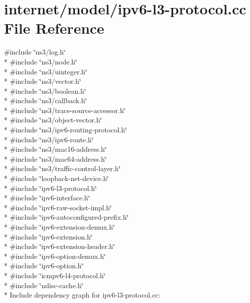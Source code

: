 \hypertarget{ipv6-l3-protocol_8cc}{}\section{internet/model/ipv6-\/l3-\/protocol.cc File Reference}
\label{ipv6-l3-protocol_8cc}
{\ttfamily \#include \char`\"{}ns3/log.\+h\char`\"{}}\\*
{\ttfamily \#include \char`\"{}ns3/node.\+h\char`\"{}}\\*
{\ttfamily \#include \char`\"{}ns3/uinteger.\+h\char`\"{}}\\*
{\ttfamily \#include \char`\"{}ns3/vector.\+h\char`\"{}}\\*
{\ttfamily \#include \char`\"{}ns3/boolean.\+h\char`\"{}}\\*
{\ttfamily \#include \char`\"{}ns3/callback.\+h\char`\"{}}\\*
{\ttfamily \#include \char`\"{}ns3/trace-\/source-\/accessor.\+h\char`\"{}}\\*
{\ttfamily \#include \char`\"{}ns3/object-\/vector.\+h\char`\"{}}\\*
{\ttfamily \#include \char`\"{}ns3/ipv6-\/routing-\/protocol.\+h\char`\"{}}\\*
{\ttfamily \#include \char`\"{}ns3/ipv6-\/route.\+h\char`\"{}}\\*
{\ttfamily \#include \char`\"{}ns3/mac16-\/address.\+h\char`\"{}}\\*
{\ttfamily \#include \char`\"{}ns3/mac64-\/address.\+h\char`\"{}}\\*
{\ttfamily \#include \char`\"{}ns3/traffic-\/control-\/layer.\+h\char`\"{}}\\*
{\ttfamily \#include \char`\"{}loopback-\/net-\/device.\+h\char`\"{}}\\*
{\ttfamily \#include \char`\"{}ipv6-\/l3-\/protocol.\+h\char`\"{}}\\*
{\ttfamily \#include \char`\"{}ipv6-\/interface.\+h\char`\"{}}\\*
{\ttfamily \#include \char`\"{}ipv6-\/raw-\/socket-\/impl.\+h\char`\"{}}\\*
{\ttfamily \#include \char`\"{}ipv6-\/autoconfigured-\/prefix.\+h\char`\"{}}\\*
{\ttfamily \#include \char`\"{}ipv6-\/extension-\/demux.\+h\char`\"{}}\\*
{\ttfamily \#include \char`\"{}ipv6-\/extension.\+h\char`\"{}}\\*
{\ttfamily \#include \char`\"{}ipv6-\/extension-\/header.\+h\char`\"{}}\\*
{\ttfamily \#include \char`\"{}ipv6-\/option-\/demux.\+h\char`\"{}}\\*
{\ttfamily \#include \char`\"{}ipv6-\/option.\+h\char`\"{}}\\*
{\ttfamily \#include \char`\"{}icmpv6-\/l4-\/protocol.\+h\char`\"{}}\\*
{\ttfamily \#include \char`\"{}ndisc-\/cache.\+h\char`\"{}}\\*
Include dependency graph for ipv6-\/l3-\/protocol.cc\+:

